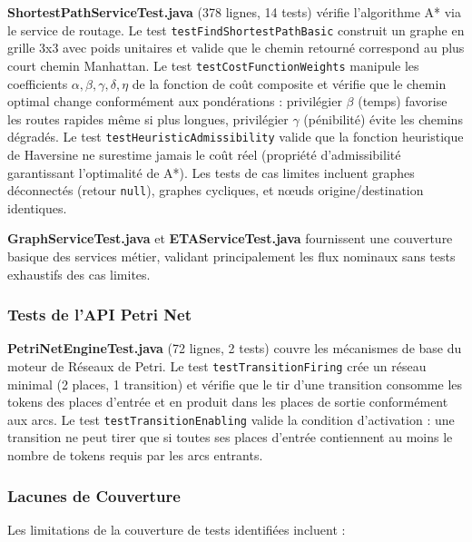 \textbf{ShortestPathServiceTest.java} (378 lignes, 14 tests) vérifie l'algorithme A* via le service de routage. Le test \texttt{testFindShortestPathBasic} construit un graphe en grille 3x3 avec poids unitaires et valide que le chemin retourné correspond au plus court chemin Manhattan. Le test \texttt{testCostFunctionWeights} manipule les coefficients $\alpha, \beta, \gamma, \delta, \eta$ de la fonction de coût composite et vérifie que le chemin optimal change conformément aux pondérations : privilégier $\beta$ (temps) favorise les routes rapides même si plus longues, privilégier $\gamma$ (pénibilité) évite les chemins dégradés. Le test \texttt{testHeuristicAdmissibility} valide que la fonction heuristique de Haversine ne surestime jamais le coût réel (propriété d'admissibilité garantissant l'optimalité de A*). Les tests de cas limites incluent graphes déconnectés (retour \texttt{null}), graphes cycliques, et nœuds origine/destination identiques.

\textbf{GraphServiceTest.java} et \textbf{ETAServiceTest.java} fournissent une couverture basique des services métier, validant principalement les flux nominaux sans tests exhaustifs des cas limites.

\subsubsection{Tests de l'API Petri Net}

\textbf{PetriNetEngineTest.java} (72 lignes, 2 tests) couvre les mécanismes de base du moteur de Réseaux de Petri. Le test \texttt{testTransitionFiring} crée un réseau minimal (2 places, 1 transition) et vérifie que le tir d'une transition consomme les tokens des places d'entrée et en produit dans les places de sortie conformément aux arcs. Le test \texttt{testTransitionEnabling} valide la condition d'activation : une transition ne peut tirer que si toutes ses places d'entrée contiennent au moins le nombre de tokens requis par les arcs entrants.

\subsubsection{Lacunes de Couverture}

Les limitations de la couverture de tests identifiées incluent :

